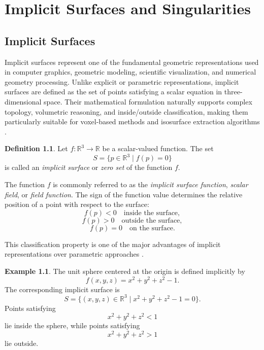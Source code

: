 \documentclass[12pt, a4paper, oneside]{book}
\theoremstyle{plain}
\theoremstyle{definition}
\newtheorem{definition}[theorem]{Definition}
\newtheorem{example}[theorem]{Example}
\theoremstyle{remark}
\theoremstyle{definition}
\begin{document}


\newpage
\chapter{Implicit Surfaces and Singularities}


\section{Implicit Surfaces}

Implicit surfaces represent one of the fundamental geometric representations used in computer graphics, geometric modeling, scientific visualization, and numerical geometry processing. Unlike explicit or parametric representations, implicit surfaces are defined as the set of points satisfying a scalar equation in three-dimensional space. Their mathematical formulation naturally supports complex topology, volumetric reasoning, and inside/outside classification, making them particularly suitable for voxel-based methods and isosurface extraction algorithms \cite{bloomenthal2000implicit}.

\begin{definition}
Let $f : \mathbb{R}^3 \to \mathbb{R}$ be a scalar-valued function. The set
\[
S = \{ p \in \mathbb{R}^3 \mid f(p) = 0 \}
\]
is called an \emph{implicit surface} or \emph{zero set} of the function $f$.
\end{definition}

The function $f$ is commonly referred to as the \emph{implicit surface function}, \emph{scalar field}, or \emph{field function}. The sign of the function value determines the relative position of a point with respect to the surface:
\[
f(p) < 0 \quad \text{inside the surface},
\]
\[
f(p) > 0 \quad \text{outside the surface},
\]
\[
f(p) = 0 \quad \text{on the surface}.
\]

This classification property is one of the major advantages of implicit representations over parametric approaches \cite{bloomenthal2000implicit}.

\begin{example}
The unit sphere centered at the origin is defined implicitly by
\[
f(x,y,z)=x^2+y^2+z^2-1.
\]
The corresponding implicit surface is
\[
S=\{(x,y,z)\in\mathbb{R}^3 \mid x^2+y^2+z^2-1=0\}.
\]
Points satisfying
\[
x^2+y^2+z^2<1
\]
lie inside the sphere, while points satisfying
\[
x^2+y^2+z^2>1
\]
lie outside.
\end{example}
\end{document}
